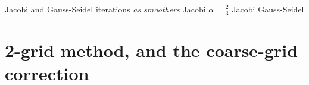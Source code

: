 \documentclass[10pt,
               svgnames,
               hyperref={colorlinks,citecolor=DeepPink4,linkcolor=FireBrick,urlcolor=Maroon},
               usepdftitle=false]{beamer}
\begin{document}
\begin{frame}{Jacobi and Gauss-Seidel iterations \emph{as smoothers}}
{\hfill {\scriptsize Jacobi \hspace{17mm} $\alpha=\frac{2}{3}$ Jacobi \hspace{12mm} Gauss-Seidel \hspace{3mm}}
}
\end{frame}


\section{2-grid method, and the coarse-grid correction}
\end{document}
